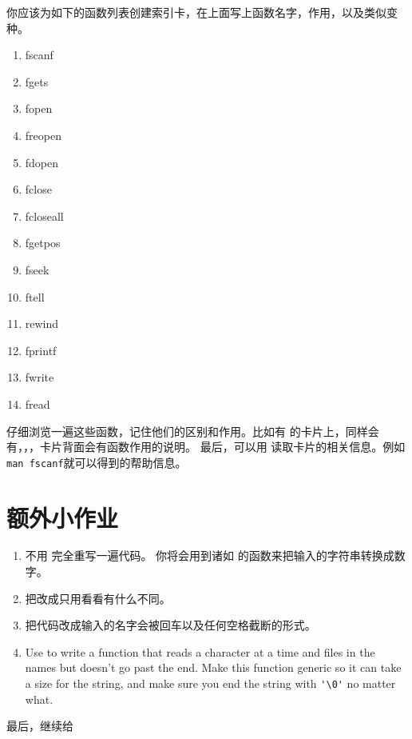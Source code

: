 你应该为如下的函数列表创建索引卡，在上面写上函数名字，作用，以及类似变种。

\begin{enumerate}
\item fscanf
\item fgets
\item fopen
\item freopen
\item fdopen
\item fclose
\item fcloseall
\item fgetpos
\item fseek
\item ftell
\item rewind
\item fprintf
\item fwrite
\item fread
\end{enumerate}

仔细浏览一遍这些函数，记住他们的区别和作用。比如有 的卡片上，同样会有，，，卡片背面会有函数作用的说明。
最后，可以用  读取卡片的相关信息。例如\verb|man fscanf|就可以得到的帮助信息。 

\section{额外小作业}

\begin{enumerate}
\item 不用  完全重写一遍代码。  你将会用到诸如 的函数来把输入的字符串转换成数字。
\item 把改成只用看看有什么不同。
\item 把代码改成输入的名字会被回车以及任何空格截断的形式。
\item Use  to write a function that reads a character at a time
    and files in the names but doesn't go past the end.  Make this function
    generic so it can take a size for the string, and make sure you end
    the string with \verb|'\0'| no matter what.
\end{enumerate}

最后，继续给
